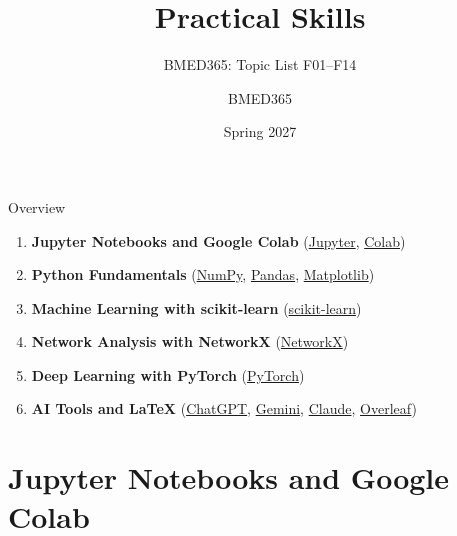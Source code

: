 \documentclass[aspectratio=169, 10pt]{beamer}
\title{Practical Skills}
\subtitle{BMED365: Topic List F01--F14}
\author{BMED365}
\date{Spring 2027}
\begin{document}
\begin{frame}
    \titlepage
\end{frame}

\begin{frame}{Overview}
    \begin{enumerate}
        \item \textbf{Jupyter Notebooks and Google Colab}
        (\href{https://jupyter.org/}{Jupyter}, \href{https://colab.research.google.com/}{Colab})
        \item \textbf{Python Fundamentals}
        (\href{https://numpy.org/}{NumPy}, \href{https://pandas.pydata.org/}{Pandas}, \href{https://matplotlib.org/}{Matplotlib})
        \item \textbf{Machine Learning with scikit-learn}
        (\href{https://scikit-learn.org/}{scikit-learn})
        \item \textbf{Network Analysis with NetworkX}
        (\href{https://networkx.org/}{NetworkX})
        \item \textbf{Deep Learning with PyTorch}
        (\href{https://pytorch.org/}{PyTorch})
        \item \textbf{AI Tools and LaTeX}
        (\href{https://chat.openai.com/}{ChatGPT}, \href{https://gemini.google.com/}{Gemini}, \href{https://claude.ai/}{Claude}, \href{https://www.overleaf.com/}{Overleaf})
    \end{enumerate}
\end{frame}

\section{Jupyter Notebooks and Google Colab}
\end{document}
